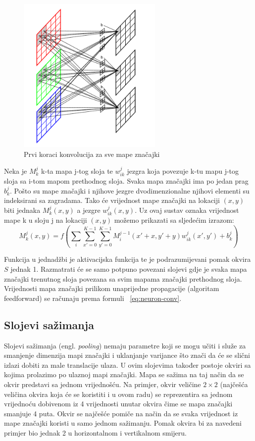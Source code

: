 \documentclass[times, utf8, zavrsni, numeric]{fer}
\begin{document}
\begin{figure}
    \centering
    \includegraphics[width=7cm]{img/konvolucija.png}
    \caption{Prvi koraci konvolucija za sve mape značajki}
    \label{fig:konvolucija}
\end{figure}

Neka je $M^j_k$ k-ta mapa j-tog sloja te $w^j_{ik}$ jezgra koja povezuje k-tu mapu j-tog sloja sa i-tom mapom prethodnog sloja. Svaka mapa značajki ima po jedan prag $b^j_k$. Pošto su mape značajki i njihove jezgre dvodimenzionalne njihovi elementi su indeksirani sa zagradama. Tako će vrijednost mape značajki na lokaciji $(x, y)$ biti jednaka $M^j_k (x, y)$ a jezgre $w^j_{ik} (x, y)$. Uz ovaj sustav oznaka vrijednost mape k u sloju j na lokaciji $(x, y)$ možemo prikazati sa sljedećim izrazom:
\begin{equation}\label{eq:neuron-conv}
M^j_k (x, y) = f(\sum_i \sum_{x'=0}^{K-1} \sum_{y'=0}^{K-1} M^{j-1}_i (x' + x, y' + y) w^j_{ik} (x', y') + b^j_k )
\end{equation}

Funkcija u jednadžbi je aktivacijska funkcija te je podrazumijevani pomak okvira $S$ jednak 1. Razmatrati će se samo potpuno povezani slojevi gdje je svaka mapa značajki trenutnog sloja povezana sa svim mapama značajki prethodnog sloja. Vrijednosti mapa značajki prilikom unaprijedne propagacije (algoritam feedforward) se računaju prema formuli ~\ref{eq:neuron-conv}.

\subsection{Slojevi sažimanja}\label{Slojevi sažimanja}
Slojevi sažimanja (engl. \textit{pooling}) nemaju parametre koji se mogu učiti i služe za smanjenje dimenzija mapi značajki i uklanjanje varijance što znači da će se slični izlazi dobiti za male translacije ulaza. U ovim slojevima također postoje okviri sa kojima prolazimo po ulaznoj mapi značajki. Mapa se sažima na taj način da se okvir predstavi sa jednom vrijednošću. Na primjer, okvir veličine $2 \times 2$ (najčešća veličina okvira koja će se koristiti i u ovom radu) se reprezentira sa jednom vrijednoću dobivenom iz 4 vrijednosti unutar okvira čime se mapa značajki smanjuje 4 puta. Okvir se najčešće pomiče na način da se svaka vrijednost iz mape značajki koristi u samo jednom sažimanju. Pomak okvira bi za navedeni primjer bio jednak 2 u horizontalnom i vertikalnom smijeru.
\end{document}
